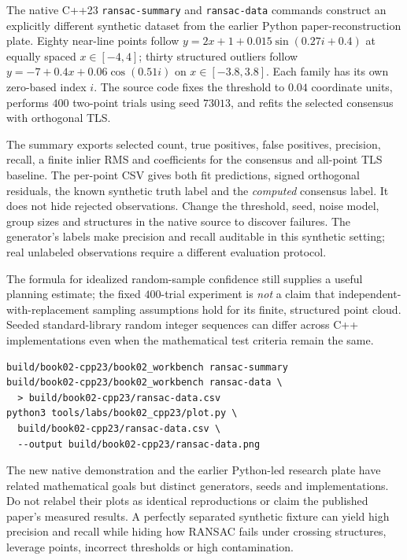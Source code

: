 \begin{booktwolab}
The native C++23 \texttt{ransac-summary} and
\texttt{ransac-data} commands construct an explicitly
different synthetic dataset from the earlier Python
paper-reconstruction plate. Eighty near-line points
follow \(y=2x+1+0.015\sin(0.27i+0.4)\) at equally
spaced \(x\in[-4,4]\); thirty structured outliers follow
\(y=-7+0.4x+0.06\cos(0.51i)\) on \(x\in[-3.8,3.8]\).
Each family has its own zero-based index \(i\). The
source code fixes the threshold to \(0.04\) coordinate
units, performs \(400\) two-point trials using
seed \(73013\), and refits the selected consensus
with orthogonal TLS.

The summary exports selected count, true positives,
false positives, precision, recall, a finite inlier
RMS and coefficients for the consensus and all-point
TLS baseline. The per-point CSV gives both fit
predictions, signed orthogonal residuals, the known
synthetic truth label and the \emph{computed} consensus
label. It does not hide rejected observations.
Change the threshold, seed, noise model, group sizes
and structures in the native source to discover failures.
The generator's labels make precision and recall
auditable in this synthetic setting; real unlabeled
observations require a different evaluation protocol.

The formula for idealized random-sample confidence
still supplies a useful planning estimate; the fixed
\(400\)-trial experiment is \emph{not} a claim that
independent-with-replacement sampling assumptions
hold for its finite, structured point cloud. Seeded
standard-library random integer sequences can differ
across C++ implementations even when the mathematical
test criteria remain the same.
\end{booktwolab}

\begin{Shaded}
\begin{verbatim}
build/book02-cpp23/book02_workbench ransac-summary
build/book02-cpp23/book02_workbench ransac-data \
  > build/book02-cpp23/ransac-data.csv
python3 tools/labs/book02_cpp23/plot.py \
  build/book02-cpp23/ransac-data.csv \
  --output build/book02-cpp23/ransac-data.png
\end{verbatim}
\end{Shaded}

\begin{booktwopitfall}[A selected consensus is not ground truth]
The new native demonstration and the earlier Python-led
research plate have related mathematical goals but
distinct generators, seeds and implementations.
Do not relabel their plots as identical reproductions
or claim the published paper's measured results.
A perfectly separated synthetic fixture can yield
high precision and recall while hiding how RANSAC
fails under crossing structures, leverage points,
incorrect thresholds or high contamination.
\end{booktwopitfall}
